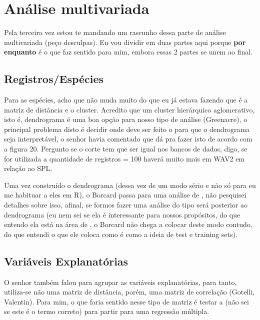 \section{Análise multivariada}

Pela terceira vez estou te mandando um rascunho dessa parte de análise multivariada (peço desculpas). Eu vou dividir em duas partes aqui porque \textbf{por enquanto} é o que faz sentido para mim, embora essas 2 partes se unem ao final.



\subsection{Registros/Espécies}

Para as espécies, acho que não muda muito do que eu já estava fazendo que é a matriz de distância e o cluster. Acredito que um cluster hierárquico aglomerativo, isto é, dendrograma é uma boa opção para nosso tipo de análise (Greenacre), o principal problema disto é decidir onde deve ser feito o  para que o dendrograma seja interpretável, o senhor havia comentado que dá pra fazer isto de acordo com a figura 20. Pergunto se o corte tem que ser igual nos bancos de dados, digo, se for utilizada a quantidade de registros = 100 haverá muito mais  em WAV2 em relação ao SPL. 

Uma vez construído o dendrograma (dessa vez de um modo sério e não só para eu me habituar a eles em R), o Borcard passa para uma análise de , não pesquisei detalhes sobre isso, afinal, se formos fazer uma análise do tipo será posterior ao dendrograma (eu nem sei se ela é interessante para nossos propósitos, do que entendo ela está na área de , o Borcard não chega a colocar deste modo contudo, do que entendi o que ele coloca como  é como a ideia de test e training sets). 

\subsection{Variáveis Explanatórias}

O senhor também falou para agrupar as variáveis explanatórias, para tanto, utiliza-se não uma matriz de distância, porém, uma matriz de correlação (Gotelli, Valentin). Para mim, o que faria sentido nesse tipo de matriz é testar a  (não sei se este é o termo correto) para partir para uma regressão múltipla. 


